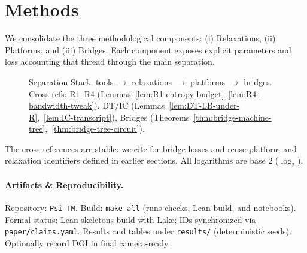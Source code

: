 \section{Methods}
We consolidate the three methodological components: (i) Relaxations, (ii) Platforms, and (iii) Bridges. Each component exposes explicit parameters and loss accounting that thread through the main separation.

\begin{figure}[H]
  \centering
  
  \caption{Separation Stack: tools $\to$ relaxations $\to$ platforms $\to$ bridges. Cross-refs: R1--R4 (Lemmas~\ref{lem:R1-entropy-budget}--\ref{lem:R4-bandwidth-tweak}), DT/IC (Lemmas~\ref{lem:DT-LB-under-R},~\ref{lem:IC-transcript}), Bridges (Theorems~\ref{thm:bridge-machine-tree},~\ref{thm:bridge-tree-circuit}).}
  \label{fig:stack}
\end{figure}

The cross-references are stable: we cite  for bridge losses and reuse platform and relaxation identifiers defined in earlier sections. All logarithms are base 2 ($\log_{2}$).

\paragraph{Artifacts \& Reproducibility.}
Repository: \texttt{Psi-TM}. Build: \texttt{make all} (runs checks, Lean build, and notebooks). Formal status: Lean skeletons build with Lake; IDs synchronized via \texttt{paper/claims.yaml}. Results and tables under \texttt{results/} (deterministic seeds). Optionally record DOI in final camera-ready.